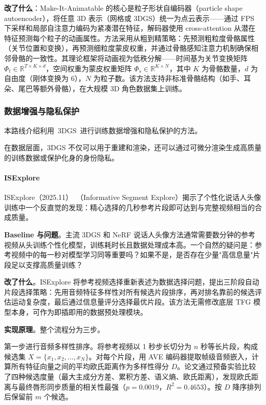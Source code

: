 \textbf{改了什么}：Make-It-Animatable 的核心是粒子形状自编码器（particle shape autoencoder），将任意 3D 表示（网格或 3DGS）统一为点云表示——通过 FPS 下采样和局部自注意力编码为紧凑潜在特征，解码器使用 cross-attention 从潜在特征预测每个粒子的动画属性。方法采用从粗到精策略：先预测粗粒度骨骼属性（关节位置和变换），再预测细粒度蒙皮权重，并通过骨骼感知注意力机制确保相邻骨骼的一致性。其理论框架将动画视为低秩分解——时间基为关节变换矩阵 $\Phi_t \in \mathbb{R}^{T \times K \times d}$，空间权重为蒙皮权重矩阵 $\Phi_s \in \mathbb{R}^{K \times N}$，其中 $K$ 为骨骼数量，$d$ 为自由度（刚体变换为 6），$N$ 为粒子数。该方法支持非标准骨骼结构（如手、耳朵、尾巴等额外骨骼），在大规模 3D 角色数据集上训练。

\subsubsection{数据增强与隐私保护}

本路线介绍利用~3DGS~进行训练数据增强和隐私保护的方法。

在数据层面，3DGS 不仅可以用于重建和渲染，还可以通过可微分渲染生成高质量的训练数据或保护化身的身份隐私。

\paragraph{ISExplore}

ISExplore（2025.11）~\cite{2511_07940}（Informative Segment Explore）揭示了个性化说话人头像训练中一个反直觉的发现：精心选择的几秒参考片段即可达到与完整视频相当的合成质量。

\textbf{Baseline 与问题}。主流 3DGS 和 NeRF 说话人头像方法通常需要数分钟的参考视频从头训练个性化模型，训练耗时长且数据处理成本高。一个自然的疑问是：参考视频中的每一秒对模型学习同等重要吗？如果不是，是否存在少量"高信息量"片段足以支撑高质量训练？

\textbf{改了什么}。ISExplore 将参考视频选择重新表述为数据选择问题，提出三阶段自动片段选择策略：先用音频特征多样性对所有候选片段排序，再对排名靠前的候选评估运动复杂度，最后通过信息量评分选择最优片段。该方法无需修改底层 TFG 模型本身，可作为即插即用的数据预处理模块。

\textbf{实现原理}。整个流程分为三步。

第一步进行音频多样性排序。将参考视频以 1 秒步长切分为 $n$ 秒等长片段，构成候选集 $X = \{x_1, x_2, \ldots, x_N\}$。对每个片段，用 AVE 编码器提取帧级音频嵌入，计算所有特征向量之间的平均欧氏距离作为多样性得分 $D$。论文通过预备实验比较了四种候选度量（最大主成分方差、累积方差、语义熵、欧氏距离），发现欧氏距离与最终唇形同步质量的相关性最强（$p = 0.0019$，$R^2 = 0.4653$）。按 $D$ 降序排列后保留前 $m$ 个候选。

